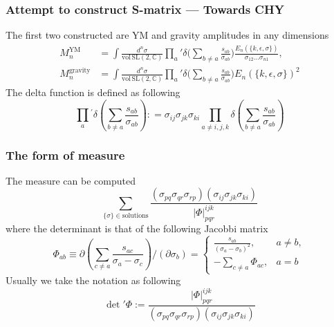 \documentclass{beamer}
\begin{document}
\begin{frame}
    \frametitle{Attempt to construct S-matrix --- Towards CHY}
    The first two constructed are YM and gravity amplitudes in any dimensions
    \begin{align*}
        M_n^{\mathrm{YM}}&=\int\frac{d^n\sigma}{\mathrm{vol\,SL}(2,\mathbb{C})}\prod_a{'}\delta\bigg(\sum_{b\neq a}\frac{s_{ab}}{\sigma_{ab}}\bigg)\frac{E_n(\{k,\epsilon,\sigma\})}{\sigma_{12}\dots\sigma_{n1}},\\
        M_n^{\mathrm{gravity}}&=\int\frac{d^n\sigma}{\mathrm{vol\,SL}(2,\mathbb{C})}\prod_a{'}\delta\bigg(\sum_{b\neq a}\frac{s_{ab}}{\sigma_{ab}}\bigg)E_n(\{k,\epsilon,\sigma\})^2
    \end{align*}
    \pause
    The delta function is defined as following
    \begin{equation*}
        \prod_{a}{}^{\prime}\delta{\left(\sum_{b\neq a}\frac{s_{ab}}{\sigma_{ab}}\right)}{:}=\sigma_{ij}\sigma_{jk}\sigma_{ki}\prod_{a\neq i,j,k}\delta{\left(\sum_{b\neq a}\frac{s_{ab}}{\sigma_{ab}}\right)}
    \end{equation*}
\end{frame}

\begin{frame}
    \frametitle{The form of measure}
    The measure can be computed %
    \begin{equation*}
            \boxed{
            \sum_{\{\sigma\}\in\mathrm{solutions}}\frac{(\sigma_{pq}\sigma_{qr}\sigma_{rp})(\sigma_{ij}\sigma_{jk}\sigma_{ki})}{|\Phi|_{pqr}^{ijk}}}
    \end{equation*}
    where the determinant is that of the following Jacobbi matrix
    \begin{equation*}
        \Phi_{ab}\equiv\partial\left(\sum_{c\neq a}\frac{s_{ac}}{\sigma_a-\sigma_c}\right)/\left(\partial\sigma_b\right)=\begin{cases}\frac{s_{ab}}{(\sigma_a-\sigma_b)^2},&a\neq b,\\-\sum_{c\neq a}\Phi_{ac}, &a=b\end{cases}
    \end{equation*}
    \pause
    Usually we take the notation as following
    \begin{equation*}
        \boxed{
        \det{'}\Phi:=\frac{|\Phi|_{pqr}^{ijk}}{(\sigma_{pq}\sigma_{qr}\sigma_{rp})(\sigma_{ij}\sigma_{jk}\sigma_{ki})}}
    \end{equation*}
\end{frame}
\end{document}
